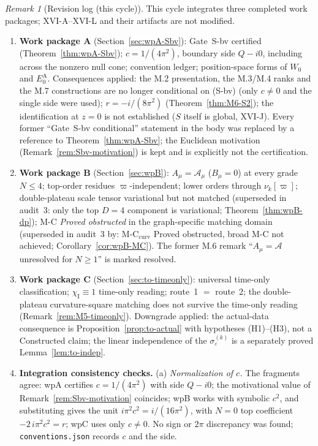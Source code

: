 \documentclass{article}
\theoremstyle{remark}
\newtheorem{remark}[proposition]{Remark}
\newcommand{\sigeps}{\sigma_\varepsilon}
\newcommand{\chiI}{\chi_{\mathrm I}}
\begin{document}
\begin{remark}[Revision log (this cycle)]
\label{rem:revlog}
This cycle integrates three completed work packages; XVI-A--XVI-L and their artifacts are not modified.
\begin{enumerate}
\item \textbf{Work package A} (Section~\ref{sec:wpA-Sbv}): Gate~S-bv certified (Theorem~\ref{thm:wpA-Sbv}); $c=1/(4\pi^2)$, boundary side $Q-i0$, including across the nonzero null cone; convention ledger; position-space forms of $W_0$ and $E_0^{\mathrm A}$.
Consequences applied: the M.2 presentation, the M.3/M.4 ranks and the M.7 constructions are no longer conditional on (S-bv) (only $c\neq0$ and the single side were used); $r=-i/(8\pi^2)$ (Theorem~\ref{thm:M6-S2}); the identification at $z=0$ is not established ($S$ itself is global, XVI-J).
Every former ``Gate~S-bv conditional'' statement in the body was replaced by a reference to Theorem~\ref{thm:wpA-Sbv}; the Euclidean motivation (Remark~\ref{rem:Sbv-motivation}) is kept and is explicitly not the certification.
\item \textbf{Work package B} (Section~\ref{sec:wpB}): $A_\mu=\mathcal A_\mu$ ($B_\mu=0$) at every grade $N\le4$; top-order residues $\varpi$-independent; lower orders through $\nu_k[\varpi]$; double-plateau scale tensor variational but not matched (superseded in audit~3: only the top $D=4$ component is variational; Theorem~\ref{thm:wpB-dp}); M-C \emph{Proved obstructed} in the graph-specific matching domain (superseded in audit~3 by: M-C$_{\mathrm{curv}}$ Proved obstructed, broad M-C not achieved; Corollary~\ref{cor:wpB-MC}).
The former M.6 remark ``$A_\mu=\mathcal A$ unresolved for $N\ge1$'' is marked resolved.
\item \textbf{Work package C} (Section~\ref{sec:to-timeonly}): universal time-only classification; $\chiI\equiv1$ time-only reading; route~1 $=$ route~2; the double-plateau curvature-square matching does not survive the time-only reading (Remark~\ref{rem:M5-timeonly}).
Downgrade applied: the actual-data consequence is Proposition~\ref{prop:to-actual} with hypotheses (H1)--(H3), not a Constructed claim; the linear independence of the $\sigeps^{(k)}$ is a separately proved Lemma~\ref{lem:to-indep}.
\item \textbf{Integration consistency checks.}
(a) \emph{Normalization of $c$.} The fragments agree: wpA certifies $c=1/(4\pi^2)$ with side $Q-i0$; the motivational value of Remark~\ref{rem:Sbv-motivation} coincides; wpB works with symbolic $c^2$, and substituting gives the unit $i\pi^2c^2=i/(16\pi^2)$, with $N=0$ top coefficient $-2\,i\pi^2c^2=r$; wpC uses only $c\neq0$. No sign or $2\pi$ discrepancy was found; \texttt{conventions.json} records $c$ and the side.

\end{enumerate}
\end{remark}
\end{document}
